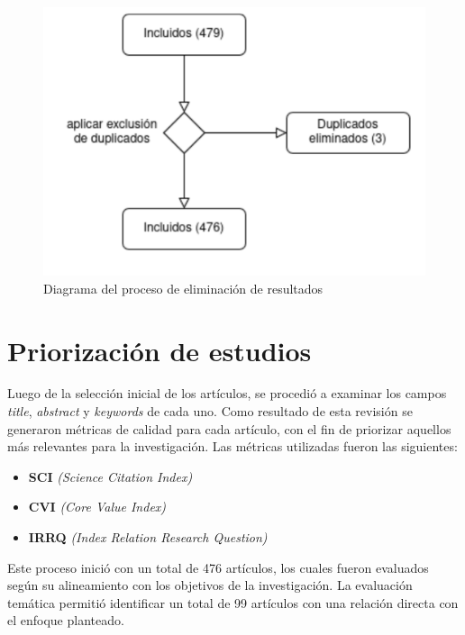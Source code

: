 \begin{figure}[H]
	\centering
	\includegraphics[scale=0.5] {tablas-images/sms/eliminacion-duplicados.png}
	\caption{Diagrama del proceso de eliminación de resultados}\label{fig:eliminacion-duplicados}
\end{figure}


\section{Priorización de estudios}\label{sec:priorizacionEstudios}
\noindent


Luego de la selección inicial de los artículos, se procedió a examinar los campos  \textit{title}, \textit{abstract} y \textit{keywords} de cada uno. Como resultado de esta revisión se generaron métricas de calidad para cada artículo, con el fin de priorizar aquellos más relevantes para la investigación. Las métricas utilizadas fueron las siguientes:

\begin{itemize}
	\item \textbf{SCI} \textit{(Science Citation Index)}
	\item \textbf{CVI} \textit{(Core Value Index)}
	\item \textbf{IRRQ} \textit{(Index Relation Research Question)}
\end{itemize}
\noindent

Este proceso inició con un total de 476 artículos, los cuales fueron evaluados según su alineamiento con los objetivos de la investigación. La evaluación temática permitió identificar un total de 99 artículos con una relación directa con el enfoque planteado.

